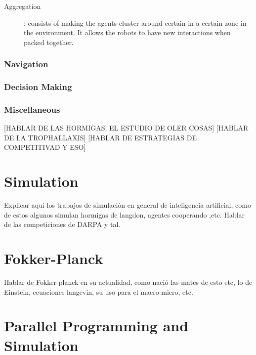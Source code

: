 \begin{description}
\item[Aggregation]: consists of making the agents cluster around certain in a certain zone in the environment. It allows the robots to have new interactions when packed together.


\end{description}

\subsubsection{Navigation}
\subsubsection{Decision Making}
\subsubsection{Miscellaneous}
[HABLAR DE LAS HORMIGAS; EL ESTUDIO DE OLER COSAS]
[HABLAR DE LA TROPHALLAXIS]
[HABLAR DE ESTRATEGIAS DE COMPETITIVAD Y ESO]


\section{Simulation}
Explicar aquí los trabajos de simulación en general de inteligencia artificial, como de estos algunos simulan hormigas de langdon, agentes cooperando ,etc. Hablar de las competiciones de DARPA y tal.

\section{Fokker-Planck}
Hablar de Fokker-planck en su actualidad, como nació las mates de esto etc, lo de Einstein, ecuaciones langevin, su uso para el macro-micro, etc.

\section{Parallel Programming and Simulation}